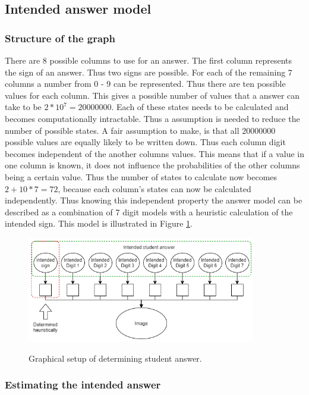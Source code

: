 \subsection{Intended answer model}
\label{sec:pgmStudentNum}

\subsubsection{Structure of the graph}

There are 8 possible columns to use for an answer. The first column represents the sign of an answer. Thus two signs are possible. For each of the remaining 7 columns a number from 0 - 9 can be represented. Thus there are ten possible values for each column. This gives a possible number of values that a answer can take to be $2*10^7 = 20 000 000$. Each of these states needs to be calculated and becomes computationally intractable. Thus a assumption is needed to reduce the number of possible states. A fair assumption to make, is that all $20 000 000$ possible values are equally likely to be written down. Thus each column digit becomes independent of the another columns values. This means that if a value in one column is known, it does not influence the probabilities of the other columns being a certain value. Thus the number of states to calculate now becomes $2+10*7=72$, because each column's states can now be calculated independently. Thus knowing this independent property the answer model can be described as a combination of 7 digit models with a heuristic calculation of the intended sign. This model is illustrated in Figure \ref{fig:stdAns}.

\begin{figure}
  \centering
  \includegraphics[width=10cm]{ans}\\
  \caption{Graphical setup of determining student answer.}
  \label{fig:stdAns}
\end{figure}


\subsubsection{Estimating the intended answer}
\label{sec:intendedDigit}

